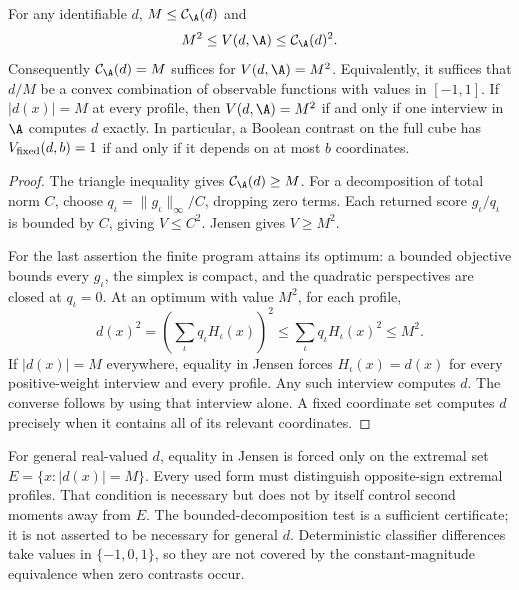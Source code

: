 \begin{proposition}\label{prop:equality}
For any identifiable $d$, $M\le \mathcal C_\A(d)$ and
\[
 M^2\le V(d,\A)\le \mathcal C_\A(d)^2.
\]
Consequently $\mathcal C_\A(d)=M$ suffices for $V(d,\A)=M^2$. Equivalently, it suffices that $d/M$ be a convex combination of observable functions with values in $[-1,1]$.
If $|d(x)|=M$ at every profile, then $V(d,\A)=M^2$ if and only if one interview in $\A$ computes $d$ exactly. In particular, a Boolean contrast on the full cube has $V_{\rm fixed}(d,b)=1$ if and only if it depends on at most $b$ coordinates.
\end{proposition}
\begin{proof}
The triangle inequality gives $\mathcal C_\A(d)\ge M$. For a decomposition of total norm $C$, choose $q_\iota=\|g_\iota\|_\infty/C$, dropping zero terms. Each returned score $g_\iota/q_\iota$ is bounded by $C$, giving $V\le C^2$. Jensen gives $V\ge M^2$.

For the last assertion the finite program attains its optimum: a bounded objective bounds every $g_\iota$, the simplex is compact, and the quadratic perspectives are closed at $q_\iota=0$. At an optimum with value $M^2$, for each profile,
\[
 d(x)^2=\left(\sum_\iota q_\iota H_\iota(x)\right)^2
 \le\sum_\iota q_\iota H_\iota(x)^2\le M^2.
\]
If $|d(x)|=M$ everywhere, equality in Jensen forces $H_\iota(x)=d(x)$ for every positive-weight interview and every profile. Any such interview computes $d$. The converse follows by using that interview alone. A fixed coordinate set computes $d$ precisely when it contains all of its relevant coordinates.
\end{proof}

For general real-valued $d$, equality in Jensen is forced only on the extremal set $E=\{x:|d(x)|=M\}$. Every used form must distinguish opposite-sign extremal profiles. That condition is necessary but does not by itself control second moments away from $E$. The bounded-decomposition test is a sufficient certificate; it is not asserted to be necessary for general $d$. Deterministic classifier differences take values in $\{-1,0,1\}$, so they are not covered by the constant-magnitude equivalence when zero contrasts occur.

